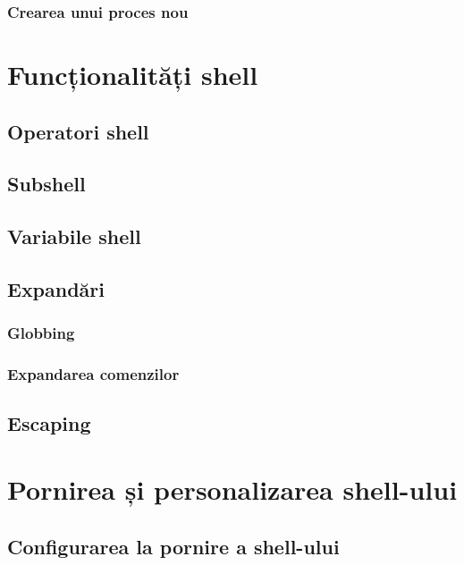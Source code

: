 \subsubsection{Crearea unui proces nou}
\label{sec:cli-new-process}

\section{Funcționalități shell}
\label{sec:cli-shell-func}

\subsection{Operatori shell}
\label{sec:cli-operators}

\subsection{Subshell}
\label{sec:cli-subshell}

\subsection{Variabile shell}
\label{sec:cli-shell-variable}

\subsection{Expandări}
\label{sec:cli-expansion}

\subsubsection{Globbing}
\label{sec:cli-globbing}

\subsubsection{Expandarea comenzilor}
\label{sec:cli-comm-expansion}

\subsection{Escaping}
\label{sec:cli-escaping}

\section{Pornirea și personalizarea shell-ului}
\label{sec:cli-customize-shell}

\subsection{Configurarea la pornire a shell-ului}
\label{sec:cli-shell-startup}

